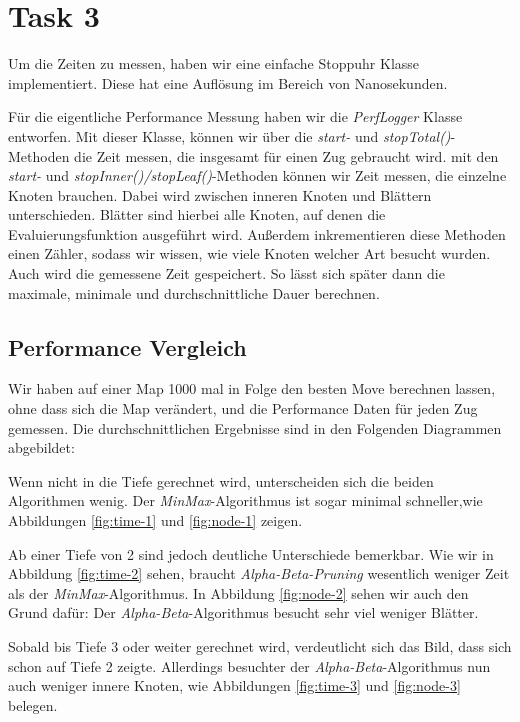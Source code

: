 \section{Task 3}
  Um die Zeiten zu messen, haben wir eine einfache Stoppuhr Klasse implementiert. 
  Diese hat eine Auflösung im Bereich von Nanosekunden.

  Für die eigentliche Performance Messung haben wir die \textit{PerfLogger} Klasse entworfen.
  Mit dieser Klasse, können wir über die \textit{start-} und \textit{stopTotal()}-Methoden
  die Zeit messen, die insgesamt für einen Zug gebraucht wird. mit den \textit{start-} und
  \textit{stopInner()/stopLeaf()}-Methoden können wir Zeit messen, die einzelne Knoten
  brauchen. Dabei wird zwischen inneren Knoten und Blättern unterschieden. Blätter sind
  hierbei alle Knoten, auf denen die Evaluierungsfunktion ausgeführt wird.
  Außerdem inkrementieren diese Methoden einen Zähler, sodass wir wissen, wie viele Knoten
  welcher Art besucht wurden.
  Auch wird die gemessene Zeit gespeichert.  So lässt sich später dann die maximale, minimale
  und durchschnittliche Dauer berechnen.

  \subsection{Performance Vergleich}
    Wir haben auf einer Map 1000 mal in Folge den besten Move berechnen lassen, ohne dass
    sich die Map verändert, und die Performance Daten für jeden Zug gemessen. Die
    durchschnittlichen Ergebnisse sind in den Folgenden Diagrammen abgebildet:
    
    Wenn nicht in die Tiefe gerechnet wird, unterscheiden sich die beiden Algorithmen wenig.
    Der \textit{MinMax}-Algorithmus ist sogar minimal schneller,wie Abbildungen
    \ref{fig:time-1} und \ref{fig:node-1} zeigen.
    
    Ab einer Tiefe von 2 sind jedoch deutliche Unterschiede bemerkbar.
    Wie wir in Abbildung \ref{fig:time-2} sehen, braucht \textit{Alpha-Beta-Pruning}
    wesentlich weniger Zeit als der \textit{MinMax}-Algorithmus. In Abbildung
    \ref{fig:node-2} sehen wir auch den Grund dafür: Der \textit{Alpha-Beta}-Algorithmus
    besucht sehr viel weniger Blätter.
    
    Sobald bis Tiefe 3 oder weiter gerechnet wird, verdeutlicht sich das Bild, dass sich
    schon auf Tiefe 2 zeigte. Allerdings besuchter der \textit{Alpha-Beta}-Algorithmus nun
    auch weniger innere Knoten, wie Abbildungen \ref{fig:time-3} und \ref{fig:node-3} belegen.
    
